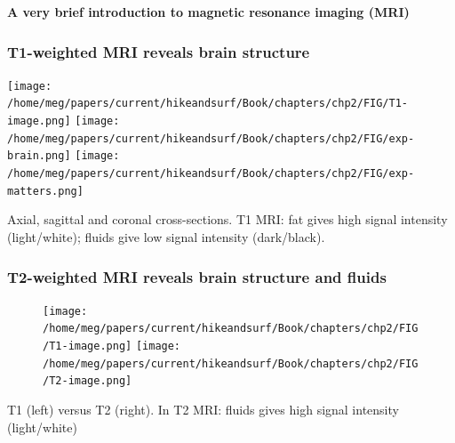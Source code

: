 \documentclass[mathserif, aspectratio=169]{beamer}
\newcommand{\mysection}[1]{\begin{frame} \begin{center} \vspace{3em} \textbf{#1} \end{center} \end{frame}}
\begin{document}


\mysection{A very brief introduction to magnetic resonance imaging (MRI)}

\begin{frame}
  \frametitle{T1-weighted MRI reveals brain structure}
  \begin{center}
  \texttt{[image: /home/meg/papers/current/hikeandsurf/Book/chapters/chp2/FIG/T1-image.png]}
  \texttt{[image: /home/meg/papers/current/hikeandsurf/Book/chapters/chp2/FIG/exp-brain.png]}
  \texttt{[image: /home/meg/papers/current/hikeandsurf/Book/chapters/chp2/FIG/exp-matters.png]}
  \end{center}

  Axial, sagittal and coronal cross-sections. T1 MRI: fat gives high
  signal intensity (light/white); fluids give low signal intensity
  (dark/black).
\end{frame}

\begin{frame}
  \frametitle{T2-weighted MRI reveals brain structure and fluids}
\begin{figure}
  \centering
  \texttt{[image: /home/meg/papers/current/hikeandsurf/Book/chapters/chp2/FIG/T1-image.png]}
  \hspace{2em}
  \texttt{[image: /home/meg/papers/current/hikeandsurf/Book/chapters/chp2/FIG/T2-image.png]}
\end{figure}
T1 (left) versus T2 (right). In T2 MRI: fluids gives high signal intensity (light/white)
\end{frame}
\end{document}
